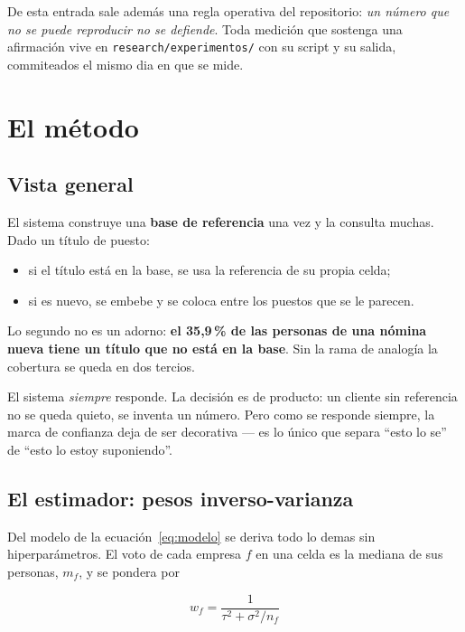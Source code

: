 \documentclass[12pt,a4paper]{report}
\begin{document}
De esta entrada sale además una regla operativa del repositorio: \emph{un número
que no se puede reproducir no se defiende}. Toda medición que sostenga una
afirmación vive en \texttt{research/experimentos/} con su script y su salida,
commiteados el mismo dia en que se mide.

\chapter{El método}

\section{Vista general}

El sistema construye una \textbf{base de referencia} una vez y la consulta muchas.
Dado un título de puesto:

\begin{itemize}[nosep]
  \item si el título está en la base, se usa la referencia de su propia celda;
  \item si es nuevo, se embebe y se coloca entre los puestos que se le parecen.
\end{itemize}

Lo segundo no es un adorno: \textbf{el 35,9\,\% de las personas de una nómina
nueva tiene un título que no está en la base}. Sin la rama de analogía la
cobertura se queda en dos tercios.

El sistema \emph{siempre} responde. La decisión es de producto: un cliente sin
referencia no se queda quieto, se inventa un número. Pero como se responde
siempre, la marca de confianza deja de ser decorativa --- es lo único que separa
``esto lo se'' de ``esto lo estoy suponiendo''.

\section{El estimador: pesos inverso-varianza}

Del modelo de la ecuación~\eqref{eq:modelo} se deriva todo lo demas sin
hiperparámetros. El voto de cada empresa $f$ en una celda es la mediana de sus
personas, $m_f$, y se pondera por

\begin{equation}
w_f = \frac{1}{\tau^2 + \sigma^2 / n_f}
\label{eq:peso}
\end{equation}
\end{document}
